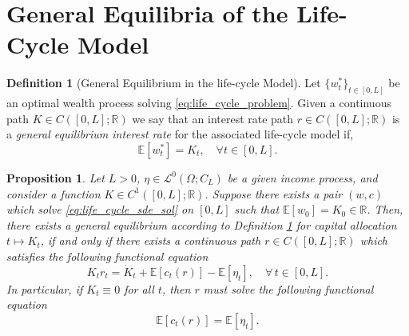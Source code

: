 \documentclass[10pt,a4paper]{amsart}
\theoremstyle{plain}
\newtheorem{prop}{Proposition}
\theoremstyle{plain}
\theoremstyle{definition}
\newtheorem{defn}{Definition}
\theoremstyle{remark}
\newcommand{\EE}{\mathbb{E}}
\newcommand{\RR}{\mathbb{R}}
\newcommand{\mbE}{\mathbb{E}}
\newcommand{\mbR}{\mathbb{R}}
\newcommand{\msL}{\mathscr{L}}
\begin{document}
\section{General Equilibria of the Life-Cycle Model}\label{sec:life_cycle_gen_eq}

\begin{defn}[General Equilibrium in the life-cycle Model] \label{def:life_cycle_gen_eq}
	Let $\{w_t^*\}_{t\in [0,L]}$ be an optimal wealth process solving \eqref{eq:life_cycle_problem}. Given a continuous path  $K\in C([0,L];\RR) $ we say that an interest rate path $r\in C([0,L];\RR)$ is a \emph{general equilibrium interest rate} for the associated life-cycle model if,
\begin{equation}\label{eq:capital_supply}
		\EE[w_t^*]=K_t,\quad \forall t\in [0,L]. 
	\end{equation}
\end{defn}

\begin{prop}\label{prop:life_cycle_rate_props}
 Let $L>0$, $\eta \in \msL^0(\Omega;C_L)$ be a given income process, and consider a function $K\in C^1([0,L];\RR)$. Suppose there exists a pair $(w,c)$ which solve  \eqref{eq:life_cycle_sde_sol} on $[0,L]$ such that $\mbE[w_0]=K_0 \in \mbR$.  
Then, there exists a general equilibrium according to Definition \ref{def:life_cycle_gen_eq} for capital allocation $t\mapsto K_t$, if and only if there exists a continuous path $r\in C([0,L];\RR)$ which satisfies  the following functional equation
    \begin{equation}\label{eq:interest_rate}
        K_t r_t = \dot{K}_t+  \EE[c_t(r)]- \EE[\eta_t] ,\quad \forall \,t \in [0,L].
    \end{equation}
   In particular, if $K_t\equiv 0$ for all $t$, then $r$ must solve the following functional equation
    \[
    \mbE[c_t(r)] = \mbE[\eta_t].  
    \]
\end{prop}
\end{document}
